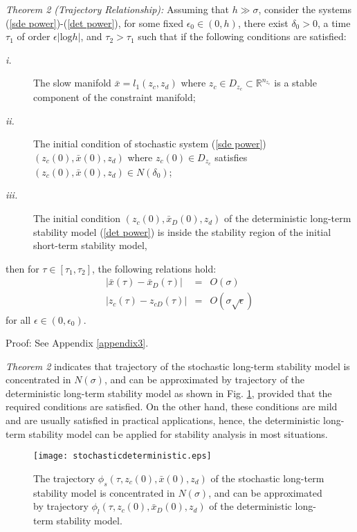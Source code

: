 \documentclass[journal]{IEEEtran}
\newcommand{\ee}{\epsilon}
\begin{document}
\textit{Theorem 2 (Trajectory Relationship):} Assuming that $h\gg\sigma$, consider the systems (\ref{sde power})-(\ref{det power}), for some fixed $\ee_0\in(0,h)$, there exist $\delta_0>0$, a time $\tau_1$ of order $\ee|\mbox{log}h|$, and $\tau_2>\tau_1$ such that if the following conditions are satisfied:

\begin{description}
\item [\textit{i.}] The slow manifold $\bar{x}=l_1(z_c,z_d)$ where $z_c\in D_{z_c}\subset\mathbb{R}^{n_{z_c}}$ is a stable component of the constraint manifold;
\item [\textit{ii.}] The initial condition of stochastic system (\ref{sde power}) $(z_c(0),\bar{x}(0),z_d)$ where $z_c(0)\in D_{z_c}$ satisfies $(z_c(0),\bar{x}(0),z_d)\in N(\delta_0)$; \item [\textit{iii.}] The initial condition $(z_{c}(0), \bar{x}_D(0),z_d)$ of the deterministic long-term stability model (\ref{det power}) is inside the stability region of the initial short-term stability model,
\end{description}

then for $\tau\in[\tau_1,\tau_2]$, the following relations hold: \begin{eqnarray}
|\bar{x}(\tau)-\bar{x}_D(\tau)|&=&O(\sigma)\label{corollary3_1}\\
|z_{c}(\tau)-z_{cD}(\tau)|&=&O(\sigma\sqrt{\ee})\label{corollary3_2}
\end{eqnarray}
for all $\ee\in(0,\ee_0)$.


Proof: See Appendix \ref{appendix3}.


\textit{Theorem 2} indicates that trajectory of the stochastic long-term stability model is concentrated in $N(\sigma)$, and can be approximated by trajectory of the deterministic long-term stability model as shown in Fig. \ref{stochasticdeterministic}, provided that the required conditions are satisfied. On the other hand, these conditions are mild and are usually satisfied in practical applications, hence, the deterministic long-term stability model can be applied for stability analysis in most situations. 
\begin{figure}[!ht]
\centering
\texttt{[image: stochasticdeterministic.eps]}\caption{The trajectory $\phi_s(\tau,z_c(0),\bar{x}(0),z_d)$ of the stochastic long-term stability model is concentrated in $N(\sigma)$, and can be approximated by trajectory $\phi_l(\tau,z_c(0),\bar{x}_D(0),z_d)$ of the deterministic long-term stability model. }\label{stochasticdeterministic}
\end{figure}
\end{document}
